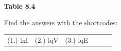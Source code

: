 \begin{enumerate}[noitemsep, label=\textbf{\arabic*}. ]
{\begin{center}
\begin{xtabular*}{\mytablewidth}[t]{|p{10\mystarwidth}|p{10\mystarwidth}|p{10\mystarwidth}|}
     \tabularnewline{}
    \end{xtabular*}
      \end{center}
    \begin{center}{\small\bfseries Table 8.4}\end{center}
        }%
    \par
  \newline
\newline
        \end{enumerate}
  \label{m39383**end}
\par {} Find the answers with the shortcodes:
 \par \begin{tabular}[h]{cccccc}
 (1.) lxI  &  (2.) lqV  &  (3.) lqE  & \end{tabular}
    \label{m39394*cid5}
